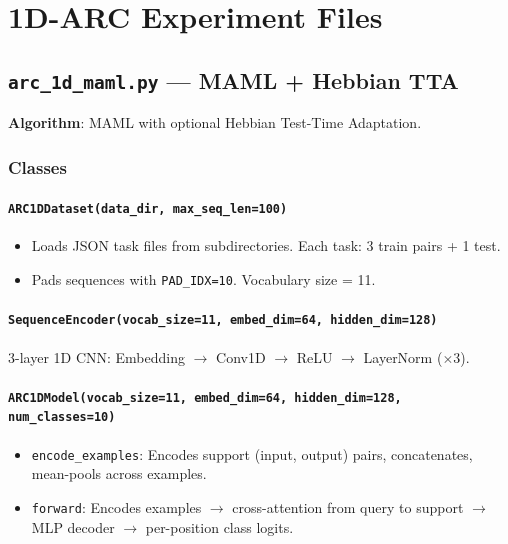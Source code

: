 \documentclass[11pt,a4paper]{article}
\begin{document}
\section{1D-ARC Experiment Files}

\subsection{\texttt{arc\_1d\_maml.py} --- MAML + Hebbian TTA}
\textbf{Algorithm}: MAML with optional Hebbian Test-Time Adaptation.

\subsubsection{Classes}
\paragraph{\texttt{ARC1DDataset(data\_dir, max\_seq\_len=100)}}
\begin{itemize}[nosep]
  \item Loads JSON task files from subdirectories. Each task: 3 train pairs + 1 test.
  \item Pads sequences with \texttt{PAD\_IDX=10}. Vocabulary size = 11.
\end{itemize}

\paragraph{\texttt{SequenceEncoder(vocab\_size=11, embed\_dim=64, hidden\_dim=128)}}
3-layer 1D CNN: Embedding $\to$ Conv1D $\to$ ReLU $\to$ LayerNorm ($\times$3).

\paragraph{\texttt{ARC1DModel(vocab\_size=11, embed\_dim=64, hidden\_dim=128, num\_classes=10)}}
\begin{itemize}[nosep]
  \item \texttt{encode\_examples}: Encodes support (input, output) pairs, concatenates, mean-pools across examples.
  \item \texttt{forward}: Encodes examples $\to$ cross-attention from query to support $\to$ MLP decoder $\to$ per-position class logits.
\end{itemize}
\end{document}
